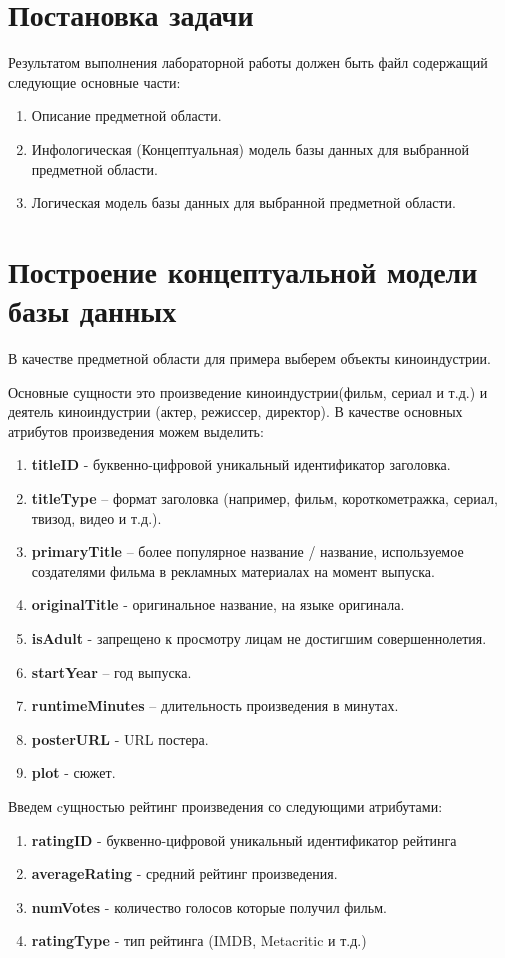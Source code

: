 \documentclass[12pt,a4paper]{article}
\begin{document}
\section{Постановка задачи}
Результатом выполнения лабораторной работы должен быть файл содержащий следующие основные части:
\begin{enumerate}
    \item Описание предметной области.
    \item Инфологическая (Концептуальная) модель базы данных для выбранной предметной области.
    \item Логическая модель базы данных для выбранной предметной области.
\end{enumerate}
\section{Построение концептуальной модели базы данных}
В качестве предметной области для примера выберем объекты киноиндустрии.\par
Основные сущности это произведение киноиндустрии(фильм, сериал и т.д.) и деятель киноиндустрии (актер, режиссер, директор).
В качестве основных атрибутов произведения можем выделить:
\begin{enumerate}
    \item \textbf{titleID} - буквенно-цифровой уникальный идентификатор заголовка.
    \item \textbf{titleType} – формат заголовка (например, фильм, короткометражка, сериал, твизод, видео и т.д.).
    \item \textbf{primaryTitle} – более популярное название / название, используемое создателями фильма в рекламных материалах на момент выпуска.
    \item \textbf{originalTitle} - оригинальное название, на языке оригинала.
    \item \textbf{isAdult} - запрещено к просмотру лицам не достигшим совершеннолетия.
    \item \textbf{startYear} – год выпуска.
    \item \textbf{runtimeMinutes} – длительность произведения в минутах.
    \item \textbf{posterURL} - URL постера.
    \item \textbf{plot} - сюжет.
\end{enumerate} \par
Введем cущностью рейтинг произведения со следующими атрибутами:
\begin{enumerate}
    \item \textbf{ratingID} - буквенно-цифровой уникальный идентификатор рейтинга 
    \item \textbf{averageRating} - средний рейтинг произведения.
    \item \textbf{numVotes} - количество голосов которые получил фильм.
    \item \textbf{ratingType} - тип рейтинга (IMDB, Metacritic и т.д.)
\end{enumerate} \par
\end{document}

